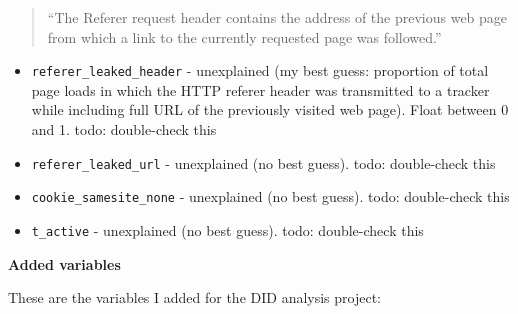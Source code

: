 \documentclass[
]{article}
\begin{document}
\begin{quote}
``The Referer request header contains the address of the previous web
page from which a link to the currently requested page was followed.''
\end{quote}

\begin{itemize}
\item
  \texttt{referer\_leaked\_header} - unexplained (my best guess:
  proportion of total page loads in which the HTTP referer header was
  transmitted to a tracker while including full URL of the previously
  visited web page). Float between 0 and 1. todo: double-check this
\item
  \texttt{referer\_leaked\_url} - unexplained (no best guess). todo:
  double-check this
\item
  \texttt{cookie\_samesite\_none} - unexplained (no best guess). todo:
  double-check this
\item
  \texttt{t\_active} - unexplained (no best guess). todo: double-check
  this
\end{itemize}

\newpage

\textbf{Added variables}

These are the variables I added for the DID analysis project:
\end{document}
